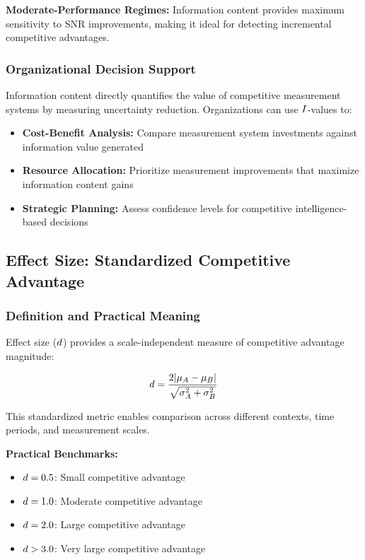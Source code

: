 \textbf{Moderate-Performance Regimes:} Information content provides maximum sensitivity to SNR improvements, making it ideal for detecting incremental competitive advantages.

\subsubsection{Organizational Decision Support}

Information content directly quantifies the value of competitive measurement systems by measuring uncertainty reduction. Organizations can use $I$-values to:
\begin{itemize}
\item \textbf{Cost-Benefit Analysis:} Compare measurement system investments against information value generated
\item \textbf{Resource Allocation:} Prioritize measurement improvements that maximize information content gains
\item \textbf{Strategic Planning:} Assess confidence levels for competitive intelligence-based decisions
\end{itemize}

\subsection{Effect Size: Standardized Competitive Advantage}

\subsubsection{Definition and Practical Meaning}

Effect size ($d$) provides a scale-independent measure of competitive advantage magnitude:

\begin{equation}
d = \frac{2|\mu_A - \mu_B|}{\sqrt{\sigma_A^2 + \sigma_B^2}}
\end{equation}

This standardized metric enables comparison across different contexts, time periods, and measurement scales.

\textbf{Practical Benchmarks:}
\begin{itemize}
\item $d = 0.5$: Small competitive advantage  
\item $d = 1.0$: Moderate competitive advantage
\item $d = 2.0$: Large competitive advantage
\item $d > 3.0$: Very large competitive advantage
\end{itemize}

